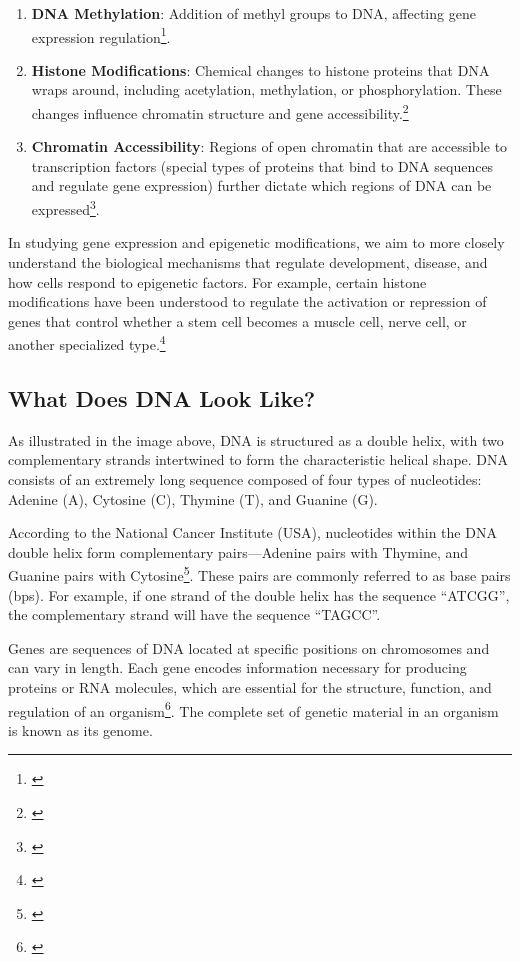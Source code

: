 \documentclass[
]{book}
\providecommand{\tightlist}{%
  \setlength{\itemsep}{0pt}\setlength{\parskip}{0pt}}
\begin{document}
\begin{enumerate}
\def\labelenumi{\arabic{enumi}.}
\tightlist
\item
  \textbf{DNA Methylation}: Addition of methyl groups to DNA, affecting gene expression regulation\footnote{\citet{nora2023}}.
\item
  \textbf{Histone Modifications}: Chemical changes to histone proteins that DNA wraps around, including acetylation, methylation, or phosphorylation. These changes influence chromatin structure and gene accessibility.\footnote{\citet{Kouzarides2007}}
\item
  \textbf{Chromatin Accessibility}: Regions of open chromatin that are accessible to transcription factors (special types of proteins that bind to DNA sequences and regulate gene expression) further dictate which regions of DNA can be expressed\footnote{\citet{melanie2021}}.
\end{enumerate}

In studying gene expression and epigenetic modifications, we aim to more closely understand the biological mechanisms that regulate development, disease, and how cells respond to epigenetic factors. For example, certain histone modifications have been understood to regulate the activation or repression of genes that control whether a stem cell becomes a muscle cell, nerve cell, or another specialized type.\footnote{\citet{moritz2020}}

\subsection{What Does DNA Look Like?}\label{what-does-dna-look-like}

As illustrated in the image above, DNA is structured as a double helix, with two complementary strands intertwined to form the characteristic helical shape. DNA consists of an extremely long sequence composed of four types of nucleotides: Adenine (A), Cytosine (C), Thymine (T), and Guanine (G).

According to the National Cancer Institute (USA), nucleotides within the DNA double helix form complementary pairs---Adenine pairs with Thymine, and Guanine pairs with Cytosine\footnote{\citet{ncidefinitions}}. These pairs are commonly referred to as base pairs (bps). For example, if one strand of the double helix has the sequence ``ATCGG'', the complementary strand will have the sequence ``TAGCC''.

Genes are sequences of DNA located at specific positions on chromosomes and can vary in length. Each gene encodes information necessary for producing proteins or RNA molecules, which are essential for the structure, function, and regulation of an organism\footnote{\citet{ncidefinitions}}. The complete set of genetic material in an organism is known as its genome.
\end{document}
